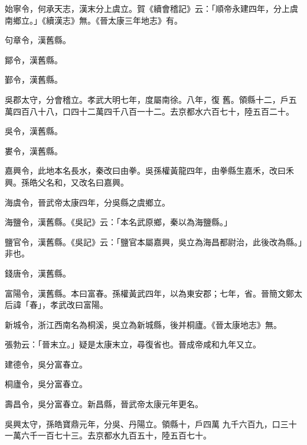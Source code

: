 \begin{pinyinscope}
 始寧令，何承天志，漢末分上虞立。賀《續會稽記》云：「順帝永建四年，分上虞南鄉立。」《續漢志》無。《晉太康三年地志》有。



 句章令，漢舊縣。



 鄮令，漢舊縣。



 鄞令，漢舊縣。



 吳郡太守，分會稽立。孝武大明七年，度屬南徐。八年，復
 舊。領縣十二，戶五萬四百八十八，口四十二萬四千八百一十二。去京都水六百七十，陸五百二十。



 吳令，漢舊縣。



 婁令，漢舊縣。



 嘉興令，此地本名長水，秦改曰由拳。吳孫權黃龍四年，由拳縣生嘉禾，改曰禾興。孫皓父名和，又改名曰嘉興。



 海虞令，晉武帝太康四年，分吳縣之虞鄉立。



 海鹽令，漢舊縣。《吳記》云：「本名武原鄉，秦以為海鹽縣。」



 鹽官令，漢舊縣。《吳記》云：「鹽官本屬嘉興，吳立為海昌都尉治，此後改為縣。」非也。



 錢唐令，漢舊縣。



 富陽令，漢舊縣。本曰富春。孫權黃武四年，以為東安郡；七年，省。晉簡文鄭太后諱「春」，孝武改曰富陽。



 新城令，浙江西南名為桐溪，吳立為新城縣，後并桐廬。《晉太康地志》無。



 張勃云：「晉末立。」疑是太康末立，尋復省也。晉成帝咸和九年又立。



 建德令，吳分富春立。



 桐廬令，吳分富春立。



 壽昌令，吳分富春立。新昌縣，晉武帝太康元年更名。



 吳興太守，孫皓寶鼎元年，分吳、丹陽立。領縣十，戶四萬
 九千六百九，口三十一萬六千一百七十三。去京都水九百五十，陸五百七十。




\end{pinyinscope}
